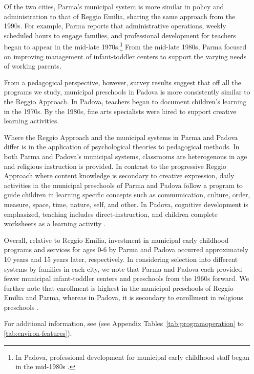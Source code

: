 Of the two cities, Parma's municipal system is more similar in policy and administration to that of Reggio Emilia, sharing the same approach from the 1990s. For example, Parma reports that administrative operations, weekly scheduled hours to engage families, and professional development for teachers began to appear in the mid-late 1970s.\footnote{In Padova, professional development for municipal early childhood staff began in the mid-1980s \citep{Becchi-Ferrari_1990_Pub-Inf-Centres-Italy}.} From the mid-late 1980s, Parma focused on improving management of infant-toddler centers to support the varying needs of working parents. 

From a pedagogical perspective, however, survey results suggest that off all the programs we study, municipal preschools in Padova is more consistently similar to the Reggio Approach. In Padova, teachers began to document children's learning in the 1970s. By the 1980s, fine arts specialists were hired to support creative learning activities. 

Where the Reggio Approach and the municipal systems in Parma and Padova differ is in the application of psychological theories to pedagogical methods. In both Parma and Padova's municipal systems, classrooms are heterogenous in age and religious instruction is provided. In contrast to the progressive Reggio Approach where content knowledge is secondary to creative expression, daily activities in the municipal preschools of Parma and Padova follow a program to guide children in learning specific concepts such as communication, culture, order, measure, space, time, nature, self, and other. In Padova, cognitive development is emphasized, teaching includes direct-instruction, and children complete worksheets as a learning activity \citep{CEHD_2016_Historical-Analysis}. 

Overall, relative to Reggio Emilia, investment in municipal early childhood programs and services for ages 0-6 by Parma and Padova occurred approximately 10 years and 15 years later, respectively. In considering selection into different systems by families in each city, we note that Parma and Padova each provided fewer municipal infant-toddler centers and preschools from the 1960s forward. We further note that enrollment is highest in the municipal preschools of Reggio Emilia and Parma, whereas in Padova, it is secondary to enrollment in religious preschools \citep{Padova-Admin-Data_1964-2011,Reggio-Admin-data_1966-2006,Reggio-Annual-Journals_1994-2011}. 

For additional information, see (see Appendix Tables~\ref{tab:programoperation} to \ref{tab:environ-features}). 

